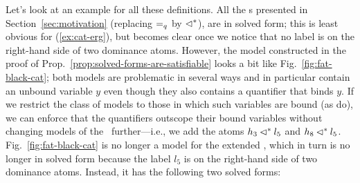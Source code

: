Let's look at an example for all these definitions.  All the \rmrs s
presented in Section~\ref{sec:motivation} (replacing $=_q$ by
$\lhd^*$), are in solved form; this is least obvious for
(\ref{ex:cat-erg}), but becomes clear once we notice that no label is
on the right-hand side of two dominance atoms.  However, the model
constructed in the proof of
Prop.~\ref{prop:solved-forms-are-satisfiable} looks a bit like
Fig.~\ref{fig:fat-black-cat}; both models are problematic in several
ways and in particular contain an unbound variable $y$ even though
they also contains a quantifier that binds $y$.  If we restrict the
class of models to those in which such variables are bound (as
 do), we can enforce that the quantifiers
outscope their bound variables without changing models of the \rmrs\
further---i.e., we add the atoms $h_3 \lhd^* l_5$ and $h_8 \lhd^* l_5$.
Fig.~\ref{fig:fat-black-cat} is no longer a model for the extended
\rmrs, which in turn is no longer in solved form because the label
$l_5$ is on the right-hand side of two dominance atoms.  Instead, it
has the following two solved forms:

